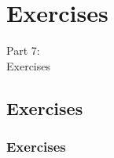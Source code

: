 
{
\renewcommand{\bgcolor}{exercises}

\section{Exercises}
\begin{frame}
  \vspace{25mm}
  \begin{center}
    \Huge{Part 7:\\Exercises}
  \end{center}
\end{frame}

\subsection{Exercises}
\begin{frame}[fragile]
  \frametitle{Exercises}
  \vspace{3mm}
  \begin{enumerate}
  \end{enumerate}
\end{frame}

}

